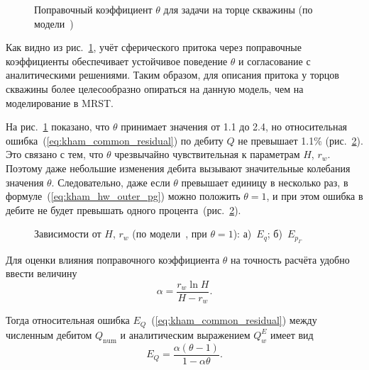\documentclass{article}
\begin{document}
\begin{figure}[!ht]
\centering

\caption{Поправочный коэффициент $\theta$ для задачи на торце скважины (по модели~\cite{lit:kham_mazo_uzku_2015})}
\label{fig:kham_hw_outer_theta_map_mgrp}
\end{figure}

Как видно из рис.~\ref{fig:kham_hw_outer_theta_map_mgrp},
учёт сферического притока через поправочные коэффициенты обеспечивает
устойчивое поведение $\theta$ и согласование с аналитическими решениями.
Таким образом, для описания притока у торцов скважины более целесообразно
опираться на данную модель, чем на моделирование в MRST.

На рис.~\ref{fig:kham_hw_outer_theta_map_mgrp} показано, что $\theta$ принимает значения от 1.1 до 2.4, но относительная ошибка~(\ref{eq:kham_common_residual}) по дебиту $Q$ не превышает 1.1\% (рис.~\ref{fig:kham_hw_outer_eq_map_mgrp}). Это связано с тем, что $\theta$ чрезвычайно чувствительная к параметрам $H$, $r_w$. Поэтому даже небольшие изменения дебита вызывают значительные колебания значения $\theta$. Следовательно, даже если $\theta$ превышает единицу в несколько раз, в формуле~(\ref{eq:kham_hw_outer_pg}) можно положить $\theta=1$, и при этом ошибка в дебите не будет превышать одного процента~(рис.~\ref{fig:kham_hw_outer_eq_map_mgrp}).

\begin{figure}[!ht]
\centering
\begin{subfigure}{0.48\textwidth}
\centering

\caption{}
\label{fig:kham_hw_outer_eq_map_mgrp}
\end{subfigure}
\hfill
\begin{subfigure}{0.48\textwidth}
\centering

\caption{}
\label{fig:kham_hw_outer_epg_map_mgrp}
\end{subfigure}
\caption{
Зависимости от $H$, $r_w$ (по модели~\cite{lit:kham_mazo_uzku_2015}, при $\theta = 1$):
а)~$E_q$;
б)~$E_{p_{\Gamma}}$
}
\label{fig:kham_hw_outer_theta_epg_maps_mgrp}
\end{figure}

Для оценки влияния поправочного коэффициента $\theta$ на точность расчёта удобно ввести величину
\[
\alpha = \frac{r_w \ln H}{H-r_w}.
\]

Тогда относительная ошибка $E_Q$~(\ref{eq:kham_common_residual}) между численным дебитом $Q_{\text{num}}$ и аналитическим выражением $Q_w^E$ имеет вид
\begin{equation}
E_Q = \dfrac{\alpha(\theta-1)}{1-\alpha\theta}.
\label{eq:kham_theta_error_exact}
\end{equation}
\end{document}
